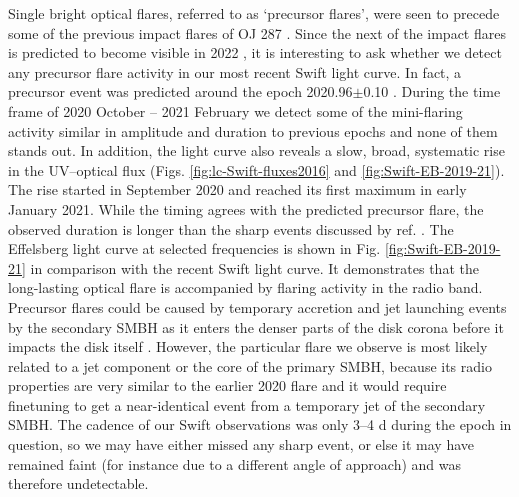 \documentclass[preprints,article,accept,moreauthors,pdftex]{Definitions/mdpi}
\begin{document}
{Single bright optical flares, referred to as `precursor flares', were seen to precede some of the previous impact flares of OJ 287 \citep{Pihajoki2013}. Since the next of the impact flares is predicted to become visible in 2022 \citep{Dey2018,  Laine2020}, it is interesting to ask whether we detect any precursor flare activity in our most recent Swift light curve. In fact, 
a precursor event was predicted around the epoch 2020.96$\pm$0.10 \citep{Pihajoki2013}. During the time frame of 
2020 October -- 2021 February we detect some of the mini-flaring activity similar in amplitude and duration to previous epochs and none of them stands out. In addition, the light curve also reveals a slow, broad, systematic rise in the UV--optical flux (Figs. \ref{fig:lc-Swift-fluxes2016} and \ref{fig:Swift-EB-2019-21}). The rise started in September 2020 and reached its first maximum in early January 2021. 
While the timing 
agrees with the predicted precursor flare, the observed duration is longer than the sharp events discussed by ref. \citep{Pihajoki2013}. 
The Effelsberg light curve at selected frequencies is shown in Fig. \ref{fig:Swift-EB-2019-21} in comparison with the recent Swift light curve. It demonstrates that the long-lasting optical flare is accompanied by flaring activity in the radio band. Precursor flares could be caused by temporary accretion and jet launching events by the secondary SMBH as it enters the denser parts of the disk corona before it impacts the disk itself \citep{Pihajoki2013, Dey2021}. However, the particular flare we observe is most likely related to a jet component or the core of the primary SMBH, because its radio properties are very similar to the earlier 2020 flare and it would require finetuning to get a near-identical event from a temporary jet of the secondary SMBH.  The cadence of our Swift observations was only 3--4 d during the epoch in question, so we may have either missed any sharp event, or else it may have remained faint (for instance due to a different angle of approach) and was therefore undetectable. 




}
\end{document}
